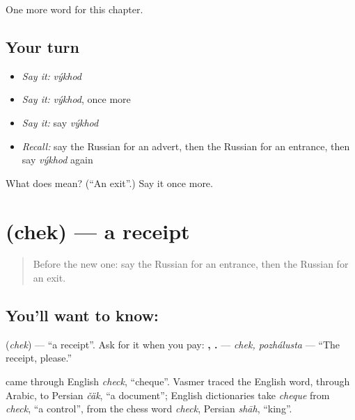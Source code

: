 \begin{grammarlens}[title={What you've built}]
One more word for this chapter.
\end{grammarlens}

\subsection*{Your turn}
\begin{itemize}
\raggedright
  \item \emph{Say it:} \emph{výkhod}
  \item \emph{Say it:} \emph{výkhod}, once more
  \item \emph{Say it:} say \emph{výkhod}
  \item \emph{Recall:} say the Russian for an advert, then the Russian for an entrance, then say \emph{výkhod} again
\end{itemize}

\begin{tcolorbox}[breakable,colback=teal!4,colframe=teal!35!black,title={Before you move on}]
What does  mean? (\textquotedblleft{}An exit\textquotedblright{}.) Say it once more.
\end{tcolorbox}
\section[\texorpdfstring{\ru{чек} (chek)}{чек (chek)}]{ (chek) — a receipt}

\label{lesson:RU-C139-chek}



\begin{quote}
Before the new one: say the Russian for an entrance, then the Russian for an exit.
\end{quote}

\subsection*{You'll want to know: }
\textbf{} (\emph{chek}) — \textquotedblleft{}a receipt\textquotedblright{}. Ask for it when you pay: \textbf{, .} — \emph{chek, pozhálusta} — \textquotedblleft{}The receipt, please.\textquotedblright{}

\begin{cousinweb}
\textbf{} came through English \emph{check}, \textquotedblleft{}cheque\textquotedblright{}. Vasmer traced the English word, through Arabic, to Persian \emph{čäk}, \textquotedblleft{}a document\textquotedblright{}; English dictionaries take \emph{cheque} from \emph{check}, \textquotedblleft{}a control\textquotedblright{}, from the chess word \emph{check}, Persian \emph{shāh}, \textquotedblleft{}king\textquotedblright{}.
\end{cousinweb}

